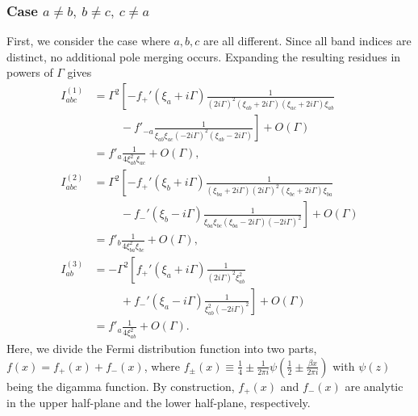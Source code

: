 \documentclass[twocolumn,superscriptaddress]{revtex4-1}
\begin{document}
\subsubsection{Case $a\neq b,\ b\neq c,\ c\neq a$}
First, we consider the case where $a,b,c$ are all different.
Since all band indices are distinct, no additional pole merging occurs. Expanding the resulting residues in powers of $\Gamma$ gives
\begin{align}
  I_{abc}^{(1)}
&=\Gamma^2\left[
- f_+'(\xi_a+i\Gamma)\frac{1}{(2i\Gamma)^2(\xi_{ab}+2i\Gamma)(\xi_{ac}+2i\Gamma)\xi_{ab}} \right. \nonumber \\
&\left. \hspace{1cm}- f'_{-a}\frac{1}{\xi_{ab}\xi_{ac}(-2i\Gamma)^2(\xi_{ab}-2i\Gamma)}
\right]+O(\Gamma) \nonumber \\
&=f'_a\frac{1}{4\xi_{ab}^2\xi_{ac}}+O(\Gamma),\\
  I_{abc}^{(2)}
&=\Gamma^2\left[
- f_+'(\xi_b+i\Gamma)\frac{1}{(\xi_{ba}+2i\Gamma)(2i\Gamma)^2(\xi_{bc}+2i\Gamma)\xi_{ba}} \right. \nonumber \\
&\left.\hspace{1cm}- f_-'(\xi_b-i\Gamma)\frac{1}{\xi_{ba}\xi_{bc}(\xi_{ba}-2i\Gamma)(-2i\Gamma)^2}
\right] +O(\Gamma) \nonumber \\
&=f'_b\frac{1}{4\xi_{ba}^2\xi_{bc}}+O(\Gamma),\\
  I_{ab}^{(3)}
&= -\Gamma^2\left[f_+'(\xi_a+i\Gamma)\frac{1}{(2i\Gamma)^2\xi_{ab}^2} \right. \nonumber \\
&\left.\hspace{1cm} +f_-'(\xi_a-i\Gamma)\frac{1}{\xi_{ab}^2(-2i\Gamma)^2}\right] +O(\Gamma) \nonumber \\
&= f'_a\frac{1}{4\xi_{ab}^2} +O(\Gamma).
\end{align}
Here, we divide the Fermi distribution function into two parts, $f(x)=f_+(x)+f_-(x)$, where $f_{\pm}(x)\equiv \frac{1}{4}\pm \frac{1}{2\pi i}\psi\left(\frac{1}{2}\pm \frac{\beta x}{2\pi i}\right)$ with $\psi(z)$ being the digamma function.
By construction, $f_+(x)$ and $f_-(x)$ are analytic in the upper half-plane and the lower half-plane, respectively.
\end{document}
